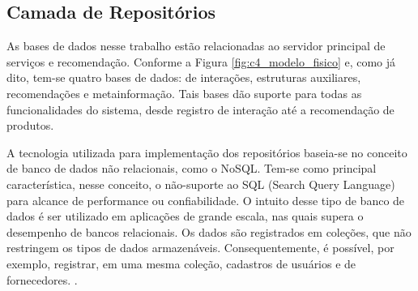 

\subsection{Camada de Repositórios}

As bases de dados nesse trabalho estão relacionadas ao servidor principal de serviços e recomendação. Conforme a Figura \ref{fig:c4_modelo_fisico} e, como já dito, tem-se quatro bases de dados: de interações, estruturas auxiliares, recomendações e metainformação. Tais bases dão suporte para todas as funcionalidades do sistema, desde registro de interação até a recomendação de produtos. 

A tecnologia utilizada para implementação dos repositórios baseia-se no conceito de banco de dados não relacionais, como o NoSQL. Tem-se como principal característica, nesse conceito, o não-suporte ao SQL (Search Query Language) para alcance de performance ou confiabilidade. O intuito desse tipo de banco de dados é ser utilizado em aplicações de grande escala, nas quais supera o desempenho de bancos relacionais. Os dados são registrados em coleções, que não restringem os tipos de dados armazenáveis. Consequentemente, é possível, por exemplo, registrar, em uma mesma coleção, cadastros de usuários e de fornecedores. \cite{Boicea2012}. 

